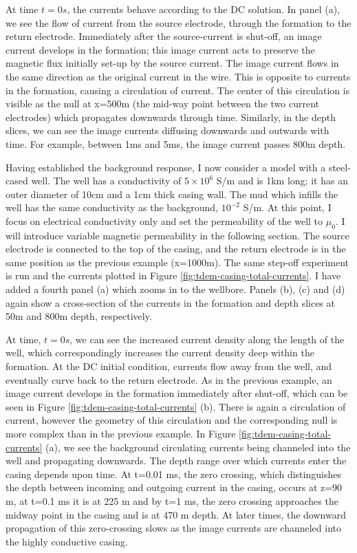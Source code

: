 At time $t=0s$, the currents behave according to the DC solution. In panel (a), we see the flow of current from the source electrode, through the formation to the return electrode. Immediately after the source-current is shut-off, an image current develops in the formation; this image current acts to preserve the magnetic flux initially set-up by the source current. The image current flows in the same direction as the original current in the wire. This is opposite to currents in the formation, causing a circulation of current. The center of this circulation is visible as the null at x=500m (the mid-way point between the two current electrodes) which propagates downwards through time. Similarly, in the depth slices, we can see the image currents diffusing downwards and outwards with time. For example, between 1ms and 5ms, the image current passes 800m depth.

Having established the background response, I now consider a model with a steel-cased well. The well has a conductivity of $5 \times 10^6$ S/m and is 1km long; it has an outer diameter of 10cm and a 1cm thick casing wall. The mud which infills the well has the same conductivity as the background, $10^{-2}$ S/m. At this point, I focus on electrical conductivity only and set the permeability of the well to $\mu_0$. I will introduce variable magnetic permeability in the following section. The source electrode is connected to the top of the casing, and the return electrode is in the same position as the previous example (x=1000m). The same step-off experiment is run and the currents plotted in Figure \ref{fig:tdem-casing-total-currents}. I have added a fourth panel (a) which zooms in to the wellbore. Panels (b), (c) and (d) again show a cross-section of the currents in the formation and depth slices at 50m and 800m depth, respectively.




At time, $t=0s$, we can see the increased current density along the length of the well, which correspondingly increases the current density deep within the formation. At the DC initial condition, currents flow away from the well, and eventually curve back to the return electrode. As in the previous example, an image current develops in the formation immediately after shut-off, which can be seen in Figure \ref{fig:tdem-casing-total-currents} (b). There is again a circulation of current, however the geometry of this circulation and the corresponding null is more complex than in the previous example. In Figure \ref{fig:tdem-casing-total-currents} (a), we see the background circulating currents being channeled into the well and propagating downwards. The depth range over which currents enter the casing depends upon time. At t=0.01 ms, the zero crossing, which distinguishes the depth between incoming and outgoing current in the casing, occurs at z=90 m, at t=0.1 ms it is at 225 m and by t=1 ms, the zero crossing approaches the midway point in the casing and is at 470 m depth. At later times, the downward propagation of this zero-crossing slows as the image currents are channeled into the highly conductive casing.

